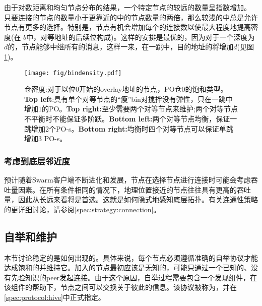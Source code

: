 由于对数距离和均匀节点分布的结果，一个特定节点的较远的数量呈指数增加。
只要连接的节点的数量小于更靠近的中的节点数量的两倍，那么较浅的中总是允许节点有更多的选择。特别是，节点有机会增加每个的连接数以使最大程度地提高密度(在 $b$中，对等地址的后续位构成)。这样的安排是最优的，因为对于一个深度为$d$的，节点能够中继所有的消息，这样一来，在一跳中，目的地址的将增加$d$(见图\ref{fig:bindensity})。 

\begin{figure}[htbp]
   \centering
   \texttt{[image: fig/bindensity.pdf]}
   \caption[本密度\statusgreen]{仓密度:对于以位$0$开始的overlay地址的节点，PO仓$0$的饱和类型。\textbf{Top left}:具有单个对等节点的“瘦”bin对搅拌没有弹性，只在一跳中增加$1$的PO。\textbf{Top right:}至少需要两个对等节点来维护;两个对等节点不平衡时不能保证多阶跃。\textbf{Bottom left:}两个对等节点均衡，保证一跳增加2个PO-s。\textbf{Bottom right:}均衡时四个对等节点可以保证单跳增加$3$ PO-s。}
   \label{fig:bindensity}
\end{figure}

\subsubsection{考虑到底层邻近度}
预计随着Swarm客户端不断进化和发展，节点在选择节点进行连接时可能会考虑吞吐量因素。在所有条件相同的情况下，地理位置接近的节点往往具有更高的吞吐量，因此从长远来看将是首选。这就是如何隐式地感知底层拓扑\cite{heep2010r}。有关连通性策略的更详细讨论，请参阅\ref{spec:strategy:connection}。


\subsection{自举和维护\statusgreen}\label{sec:bootstrapping}
 
 
本节讨论稳定的是如何出现的。具体来说，每个节点必须遵循准确的自举协议才能达成饱和的并维持它。加入的节点最初应该是无知的，可能只通过一个已知的、没有先验知识的peer发起连接。由于这个原因，自举过程需要包含一个发现组件，在该组件的帮助下，节点之间可以交换关于彼此的信息。该协议被称为，并在\ref{spec:protocol:hive}中正式指定。

